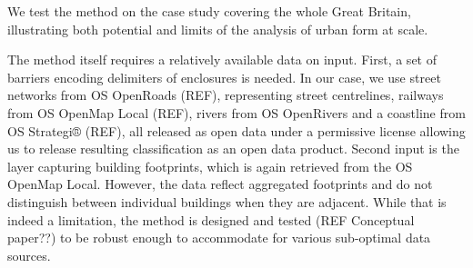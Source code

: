 We test the method on the case study covering the whole Great Britain, illustrating both
potential and limits of the analysis of urban form at scale.

The method itself requires a relatively available data on input. First, a set of
barriers encoding delimiters of enclosures is needed. In our case, we use street
networks from OS OpenRoads (REF), representing street centrelines, railways from OS
OpenMap Local (REF), rivers from OS OpenRivers and a coastline from OS Strategi® (REF),
all released as open data under a permissive license allowing us to release
resulting classification as an open data product. Second input is the layer capturing
building footprints, which is again retrieved from the OS OpenMap Local. However, the
data reflect aggregated footprints and do not distinguish between individual buildings
when they are adjacent. While that is indeed a limitation, the method is designed and
tested (REF Conceptual paper??) to be robust enough to accommodate for various
sub-optimal data sources.
